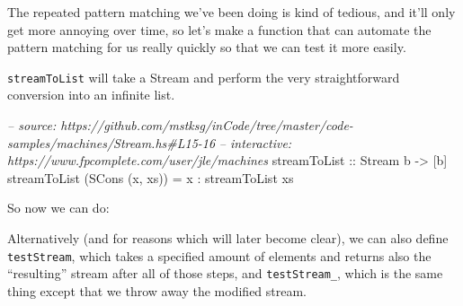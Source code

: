 \documentclass[]{article}
\newenvironment{Shaded}{}{}
\newcommand{\DataTypeTok}[1]{\textcolor[rgb]{0.56,0.13,0.00}{{#1}}}
\newcommand{\DecValTok}[1]{\textcolor[rgb]{0.25,0.63,0.44}{{#1}}}
\newcommand{\CommentTok}[1]{\textcolor[rgb]{0.38,0.63,0.69}{\textit{{#1}}}}
\newcommand{\OtherTok}[1]{\textcolor[rgb]{0.00,0.44,0.13}{{#1}}}
\newcommand{\FunctionTok}[1]{\textcolor[rgb]{0.02,0.16,0.49}{{#1}}}
\newcommand{\NormalTok}[1]{{#1}}
\begin{document}
The repeated pattern matching we've been doing is kind of tedious, and
it'll only get more annoying over time, so let's make a function that
can automate the pattern matching for us really quickly so that we can
test it more easily.

\texttt{streamToList} will take a Stream and perform the very
straightforward conversion into an infinite list.

\begin{Shaded}
\begin{Highlighting}[]
\CommentTok{-- source: https://github.com/mstksg/inCode/tree/master/code-samples/machines/Stream.hs#L15-16}
\CommentTok{-- interactive: https://www.fpcomplete.com/user/jle/machines}
\OtherTok{streamToList ::} \DataTypeTok{Stream} \NormalTok{b }\OtherTok{->} \NormalTok{[b]}
\NormalTok{streamToList (}\DataTypeTok{SCons} \NormalTok{(x, xs)) }\FunctionTok{=} \NormalTok{x }\FunctionTok{:} \NormalTok{streamToList xs}
\end{Highlighting}
\end{Shaded}

So now we can do:

\begin{Shaded}
\end{Shaded}

Alternatively (and for reasons which will later become clear), we can
also define \texttt{testStream}, which takes a specified amount of
elements and returns also the ``resulting'' stream after all of those
steps, and \texttt{testStream\_}, which is the same thing except that we
throw away the modified stream.
\end{document}
